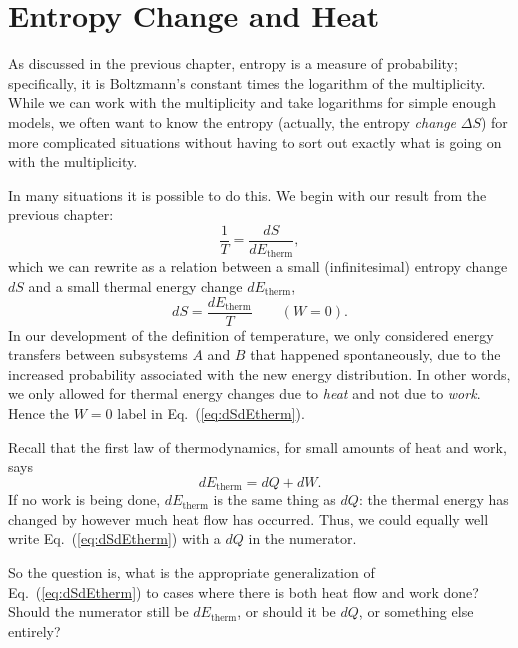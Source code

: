 \section{Entropy Change and Heat}

As discussed in the previous chapter, entropy is a measure of
probability; specifically, it is Boltzmann's constant times the
logarithm of the multiplicity.  While we can work with the
multiplicity and take logarithms for simple enough models, we often
want to know the entropy (actually, the entropy {\it change} $\Delta
S$) for more complicated situations without having to sort out exactly
what is going on with the multiplicity.

In many situations it is possible to do this.  We begin with our
result from the previous chapter:
\begin{equation}
\frac{1}{T} = \frac{dS}{dE_\text{therm}},
\end{equation}
which we can rewrite as a relation between a small (infinitesimal) entropy
change $dS$ and a small thermal energy change $dE_\text{therm}$,
\begin{equation}
dS = \frac{dE_\text{therm}}{T} \qquad(W=0).
\label{eq:dSdEtherm}
\end{equation}
In our development of the definition of temperature, we only
considered energy transfers between subsystems $A$ and $B$ that
happened spontaneously, due to the increased probability associated
with the new energy distribution.  In other words, we only allowed for
thermal energy changes due to {\it heat} and not due to {\it work}.
Hence the $W=0$ label in Eq.~(\ref{eq:dSdEtherm}).

Recall that the first law of thermodynamics, for small amounts of heat
and work, says
\begin{equation}
dE_\text{therm} = dQ + dW.
\end{equation}
If no work is being done, $dE_\text{therm}$ is the same thing as $dQ$:
the thermal energy has changed by however much heat flow has occurred.
Thus, we could equally well write Eq.~(\ref{eq:dSdEtherm}) with a $dQ$
in the numerator.

So the question is, what is the appropriate generalization of
Eq.~(\ref{eq:dSdEtherm}) to cases where there is both heat flow and
work done?  Should the numerator still be $dE_\text{therm}$, or should
it be $dQ$, or something else entirely?

